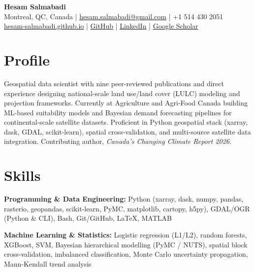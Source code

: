 \documentclass[10pt, a4paper]{article}
\begin{document}

\begin{center}
  {\LARGE\bfseries\color{headingblue} Hesam Salmabadi}\\[4pt]
  {\small
    Montreal, QC, Canada \quad|\quad
    \href{mailto:hesam.salmabadi@gmail.com}{hesam.salmabadi@gmail.com} \quad|\quad
    +1 514 430 2051 \\[2pt]
    \href{https://hesam-salmabadi.github.io}{hesam-salmabadi.github.io} \quad|\quad
    \href{https://github.com/hesam-salmabadi}{GitHub} \quad|\quad
    \href{https://www.linkedin.com/in/hesam-salmabadi/}{LinkedIn} \quad|\quad
    \href{https://scholar.google.com/citations?user=QAvXX3cAAAAJ}{Google Scholar}
  }
\end{center}

\vspace{2pt}

\section{Profile}

Geospatial data scientist with nine peer-reviewed publications and direct experience
designing national-scale land use/land cover (LULC) modeling and projection
frameworks. Currently at Agriculture and Agri-Food Canada building ML-based
suitability models and Bayesian demand forecasting pipelines for continental-scale
satellite datasets. Proficient in Python geospatial stack (xarray, dask, GDAL,
scikit-learn), spatial cross-validation, and multi-source satellite data integration.
Contributing author, \textit{Canada's Changing Climate Report 2026}.

\section{Skills}

\noindent\textbf{Programming \& Data Engineering:} Python (xarray, dask, numpy,
pandas, rasterio, geopandas, scikit-learn, PyMC, matplotlib, cartopy, h5py),
GDAL/OGR (Python \& CLI), Bash, Git/GitHub, LaTeX, MATLAB

\vspace{3pt}
\noindent\textbf{Machine Learning \& Statistics:} Logistic regression (L1/L2),
random forests, XGBoost, SVM, Bayesian hierarchical modelling (PyMC / NUTS),
spatial block cross-validation, imbalanced classification, Monte Carlo uncertainty
propagation, Mann-Kendall trend analysis
\end{document}
